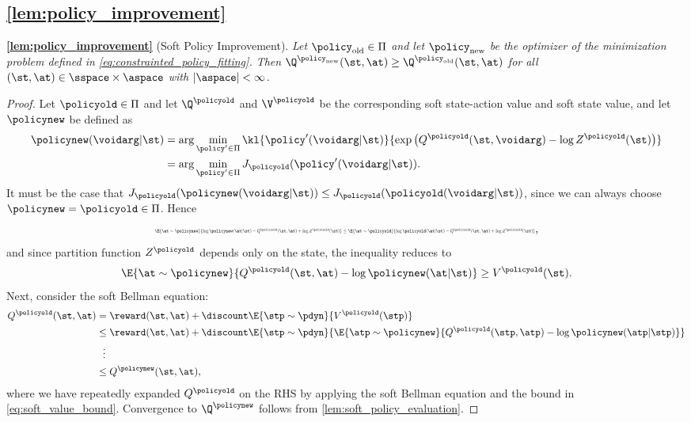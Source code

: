 \documentclass{article}
\begin{document}
\subsection{\autoref{lem:policy_improvement}}
\label{app:lem_policy_improvement}


\textbf{\autoref{lem:policy_improvement}} (Soft Policy Improvement).\textit{
Let $\policy_\mathrm{old} \in \Pi$ and let $\policy_\mathrm{new}$ be the optimizer of the minimization problem defined in \autoref{eq:constrainted_policy_fitting}. Then $\Q^{\policy_\mathrm{new}}(\st, \at) \geq \Q^{\policy_\mathrm{old}}(\st, \at)$ for all $(\st, \at) \in \sspace\times\aspace$ with $|\aspace|<\infty$.}
\begin{proof}
%
Let $\policyold\in \Pi$ and let $\Q^\policyold$ and $\V^\policyold$ be the corresponding soft state-action value and soft state value, and let $\policynew$ be defined as 
\begin{align}
\policynew(\voidarg|\st) &= \arg \min_{\policy' \in \Pi}\kl{\policy'(\voidarg|\st)}{\exp\left(Q^\policyold(\st,\voidarg) - \log Z^\policyold(\st)\right)}\notag\\
 &= \arg\min_{\policy'\in\Pi}J_\policyold(\policy'(\voidarg|\st)).
\end{align}
It must be the case that $J_\policyold(\policynew(\voidarg|\st)) \leq J_\policyold(\policyold(\voidarg|\st))$, since we can always choose $\policynew = \policyold\in\Pi$. Hence
\begin{align}
\resizebox{1\textwidth}{!}{$
\E{\at\sim\policynew}{\log \policynew(\at|\st) - Q^\policyold(\st, \at) + \log Z^\policyold(\st)}
\leq \E{\at\sim\policyold}{\log \policyold(\at|\st) - Q^\policyold(\st,\at) + \log Z^\policyold(\st)}$},
\end{align}
and since partition function $Z^\policyold$ depends only on the state, the inequality reduces to
\begin{align}
\E{\at\sim\policynew}{Q^\policyold(\st, \at) - \log \policynew(\at|\st)} \geq V^\policyold(\st).
\label{eq:soft_value_bound}
\end{align}
Next, consider the soft Bellman equation:
\begin{align}
Q^\policyold(\st, \at) &= \reward(\st, \at) + \discount\E{\stp\sim\pdyn}{V^\policyold(\stp)}\notag\\
&\leq \reward(\st, \at) + \discount\E{\stp\sim\pdyn}{\E{\atp\sim\policynew}{Q^\policyold(\stp, \atp) - \log \policynew(\atp|\stp)}}\notag\\
&\ \  \vdots\notag\\
& \leq Q^\policynew(\st, \at),
\end{align}
where we have repeatedly expanded $Q^\policyold$ on the RHS by applying the soft Bellman equation and the bound in \autoref{eq:soft_value_bound}. Convergence to $\Q^\policynew$ follows from \autoref{lem:soft_policy_evaluation}.
\end{proof}
\end{document}
